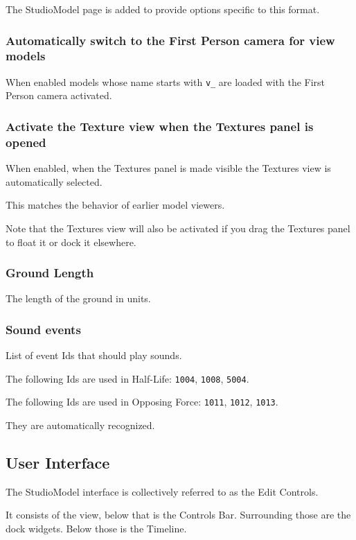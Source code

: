 \documentclass[10pt, a4paper, titlepage, oneside]{article}
\newcommand{\code}[1]{\mbox{\texttt{#1}}}
\begin{document}
The StudioModel page is added to provide options specific to this format.

\subsubsection{Automatically switch to the First Person camera for view models}

When enabled models whose name starts with \code{v\_} are loaded with the First Person camera activated.

\subsubsection{Activate the Texture view when the Textures panel is opened}

When enabled, when the Textures panel is made visible the Textures view is automatically selected.

This matches the behavior of earlier model viewers.

Note that the Textures view will also be activated if you drag the Textures panel to float it or dock it elsewhere.

\subsubsection{Ground Length}

The length of the ground in units.

\subsubsection{Sound events}

List of event Ids that should play sounds.

The following Ids are used in Half-Life: \code{1004}, \code{1008}, \code{5004}.

The following Ids are used in Opposing Force: \code{1011}, \code{1012}, \code{1013}.

They are automatically recognized.

\newpage

\subsection{User Interface}

The StudioModel interface is collectively referred to as the Edit Controls.

It consists of the view, below that is the Controls Bar. Surrounding those are the dock widgets. Below those is the Timeline.
\end{document}
